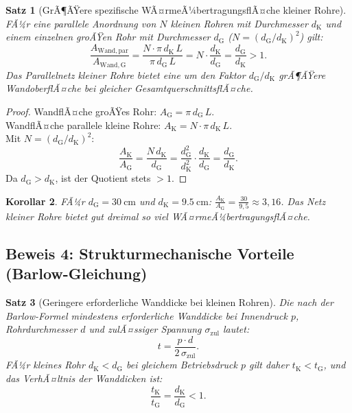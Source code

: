 ﻿\documentclass[12pt,a4paper,twoside]{article}
\theoremstyle{plain}
\newtheorem{theorem}{Satz}[section]
\newtheorem{corollary}[theorem]{Korollar}
\theoremstyle{definition}
\theoremstyle{remark}
\newcommand{\dG}{d_{\mathrm{G}}}
\newcommand{\dK}{d_{\mathrm{K}}}
\begin{document}
\begin{theorem}[GrÃ¶ÃŸere spezifische WÃ¤rmeÃ¼bertragungsflÃ¤che kleiner Rohre]
\label{thm:waermeflaeche}
FÃ¼r eine parallele Anordnung von $N$ kleinen Rohren mit Durchmesser $\dK$
und einem einzelnen groÃŸen Rohr mit Durchmesser $\dG$ ($N = (\dG/\dK)^2$)
gilt:
\begin{equation}
  \frac{A_{\mathrm{Wand,par}}}{A_{\mathrm{Wand,G}}}
    = \frac{N \cdot \pi\,\dK\,L}{\pi\,\dG\,L}
    = N \cdot \frac{\dK}{\dG}
    = \frac{\dG}{\dK} > 1.
  \label{eq:waermeflaeche}
\end{equation}
Das Parallelnetz kleiner Rohre bietet eine um den Faktor $\dG/\dK$
grÃ¶ÃŸere WandoberflÃ¤che bei gleicher GesamtquerschnittsflÃ¤che.
\end{theorem}

\begin{proof}
  WandflÃ¤che groÃŸes Rohr: $A_{\mathrm{G}} = \pi\,\dG\,L$.\\
  WandflÃ¤che parallele kleine Rohre: $A_{\mathrm{K}} = N \cdot \pi\,\dK\,L$.\\
  Mit $N = (\dG/\dK)^2$:
  \begin{equation}
    \frac{A_{\mathrm{K}}}{A_{\mathrm{G}}}
      = \frac{N\,\dK}{\dG}
      = \frac{\dG^2}{\dK^2} \cdot \frac{\dK}{\dG}
      = \frac{\dG}{\dK}.
  \end{equation}
  Da $\dG > \dK$, ist der Quotient stets $> 1$.
\end{proof}

\begin{corollary}
\label{cor:waermeflaeche}
FÃ¼r $\dG = \SI{30}{\centi\metre}$ und $\dK = \SI{9.5}{\centi\metre}$:
$\frac{A_{\mathrm{K}}}{A_{\mathrm{G}}} = \frac{30}{9{,}5} \approx 3{,}16$.
Das Netz kleiner Rohre bietet gut dreimal so viel WÃ¤rmeÃ¼bertragungsflÃ¤che.
\end{corollary}

\subsection{Beweis 4: Strukturmechanische Vorteile (Barlow-Gleichung)}
\label{ssec:beweis_barlow}

\begin{theorem}[Geringere erforderliche Wanddicke bei kleinen Rohren]
\label{thm:barlow}
Die nach der Barlow-Formel mindestens erforderliche Wanddicke bei
Innendruck $p$, Rohrdurchmesser $d$ und zulÃ¤ssiger Spannung
$\sigma_{\mathrm{zul}}$ lautet:
\begin{equation}
  t = \frac{p \cdot d}{2\,\sigma_{\mathrm{zul}}}.
  \label{eq:barlow}
\end{equation}
FÃ¼r kleines Rohr $\dK < \dG$ bei gleichem Betriebsdruck $p$ gilt daher
$t_{\mathrm{K}} < t_{\mathrm{G}}$, und das VerhÃ¤ltnis der Wanddicken ist:
\begin{equation}
  \frac{t_{\mathrm{K}}}{t_{\mathrm{G}}} = \frac{\dK}{\dG} < 1.
  \label{eq:wanddicke_verhaltnis}
\end{equation}
\end{theorem}
\end{document}
